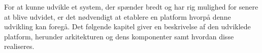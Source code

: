 For at kunne udvikle et system, der spænder bredt og har rig mulighed for senere at blive udvidet, er det nødvendigt at etablere en platform hvorpå denne udvikling kan foregå.
Det følgende kapitel giver en beskrivelse af den udviklede platform, herunder arkitekturen og dens komponenter samt hvordan disse realiseres.
